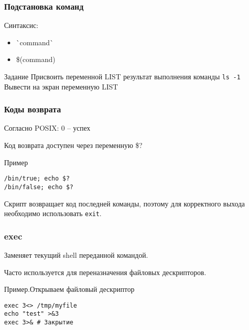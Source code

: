 
\begin{frame}
	\frametitle{Подстановка команд}
	
	Синтаксис:

	\begin{itemize}
		\item \`{}command\`{}
		\item \$(command)
	\end{itemize}
	\pause
	\begin{block}{Задание}
		Присвоить переменной LIST результат выполнения команды {\tt ls -1} \\
		Вывести на экран переменную LIST
	\end{block}
\end{frame}

\begin{frame}[fragile]
	\frametitle{Коды возврата}

	Согласно POSIX: 0 -- успех

	Код возврата доступен через переменную \$?

	\pause
	\begin{block}{Пример}
		\begin{lstlisting}
/bin/true; echo $?
/bin/false; echo $?
		\end{lstlisting}
	\end{block}

	Скрипт возвращает код последней команды, поэтому для корректного выхода необходимо использовать {\tt exit}.

\end{frame}


\begin{frame}[fragile]
	\frametitle{exec}

	Заменяет текущий shell переданной командой. 

	Часто используется для переназначения файловых дескрипторов.

    \begin{block}{Пример.Открываем файловый дескриптор}
      \begin{lstlisting}
exec 3<> /tmp/myfile
echo "test" >&3
exec 3>& # Закрытие
      \end{lstlisting}
    \end{block}

\end{frame}

